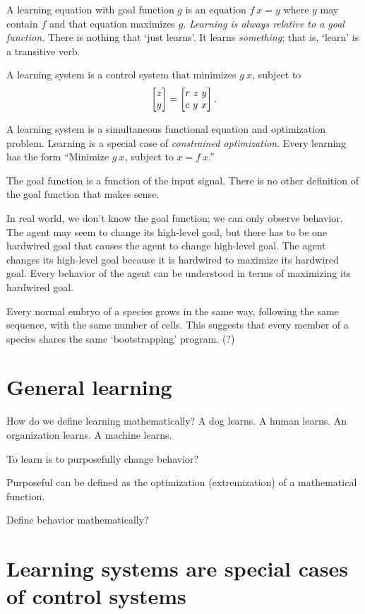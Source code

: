 A learning equation with goal function \(g\)
is an equation \( f~x = y \) where \( y \) may contain \( f \)
and that equation maximizes \( g \).
\emph{Learning is always relative to a goal function.}
There is nothing that `just learns'.
It learns \emph{something};
that is, `learn' is a transitive verb.

A learning system is a control system that minimizes \(g~x\), subject to
\[
    \begin{bmatrix}z \\ y\end{bmatrix} = \begin{bmatrix}r~z~y \\ c~y~x\end{bmatrix}.
\]

A learning system is a simultaneous functional equation and optimization problem.
Learning is a special case of \emph{constrained optimization}.
Every learning has the form ``Minimize \(g~x\), subject to \(x = f~x\).''

The goal function is a function of the input signal.
There is no other definition of the goal function that makes sense.

In real world, we don't know the goal function;
we can only observe behavior.
The agent may seem to change its high-level goal,
but there has to be one hardwired goal that causes the agent to change high-level goal.
The agent changes its high-level goal because it is hardwired to maximize its hardwired goal.
Every behavior of the agent can be understood in terms of maximizing its hardwired goal.

Every normal embryo of a species grows in the same way,
following the same sequence,
with the same number of cells.
This suggests that every member of a species
shares the same `bootstrapping' program. (?)

\section{General learning}

How do we define learning mathematically?
A dog learns. A human learns. An organization learns. A machine learns.

To learn is to purposefully change behavior?

Purposeful can be defined as the optimization (extremization) of a mathematical function.

Define behavior mathematically?

\section{Learning systems are special cases of control systems}

